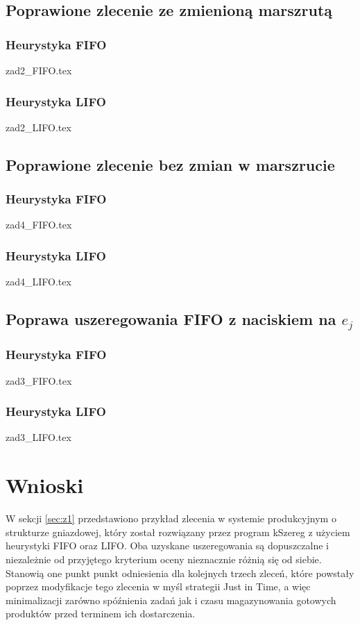\documentclass[twoside]{kInzynierka}
\begin{document}
\newpage
\subsection     {Poprawione zlecenie ze zmienioną marszrutą}
\label{sec:z2}
\subsubsection  {Heurystyka FIFO}
\label{sec:z2f}
 {zad2_FIFO.tex}
\subsubsection  {Heurystyka LIFO}
\label{sec:z2l}
 {zad2_LIFO.tex}

\newpage
\subsection     {Poprawione zlecenie bez zmian w marszrucie}
\label{sec:z3}
\subsubsection  {Heurystyka FIFO}
\label{sec:z3f}
 {zad4_FIFO.tex}
\subsubsection  {Heurystyka LIFO}
\label{sec:z3l}
 {zad4_LIFO.tex}

\newpage
\subsection     {Poprawa uszeregowania FIFO z naciskiem na $e_j$ }
\label{sec:z4}
\subsubsection  {Heurystyka FIFO}
\label{sec:z4f}
 {zad3_FIFO.tex}
\subsubsection  {Heurystyka LIFO}
\label{sec:z4l}
 {zad3_LIFO.tex}



\section        {Wnioski}
W sekcji \ref{sec:z1} przedstawiono przykład zlecenia w systemie produkcyjnym o strukturze gniazdowej, który został rozwiązany przez program kSzereg z użyciem heurystyki FIFO oraz LIFO. Oba uzyskane uszeregowania są dopuszczalne i niezależnie od przyjętego kryterium oceny nieznacznie różnią się od siebie. Stanowią one punkt punkt odniesienia dla kolejnych trzech zleceń, które powstały poprzez modyfikacje tego zlecenia w myśl strategii Just in Time, a więc minimalizacji zarówno spóźnienia zadań jak i czasu magazynowania gotowych produktów przed terminem ich dostarczenia. 
\end{document}
